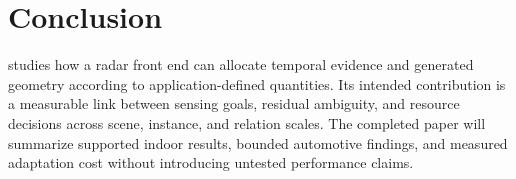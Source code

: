 \section{Conclusion}
\label{sec:conclusion}
\TaskRadar{} studies how a radar front end can allocate temporal evidence and generated geometry according to application-defined quantities. Its intended contribution is a measurable link between sensing goals, residual ambiguity, and resource decisions across scene, instance, and relation scales. The completed paper will summarize supported indoor results, bounded automotive findings, and measured adaptation cost without introducing untested performance claims.
